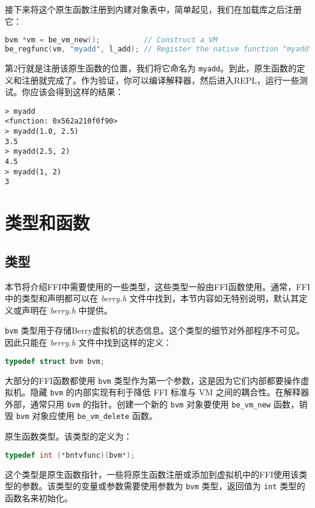 接下来将这个原生函数注册到内建对象表中，简单起见，我们在加载库之后注册它：
\begin{lstlisting}[language=c, style=berry]
bvm *vm = be_vm_new();          // Construct a VM
be_regfunc(vm, "myadd", l_add); // Register the native function "myadd"
\end{lstlisting}
第2行就是注册该原生函数的位置，我们将它命名为 \texttt{myadd}。到此，原生函数的定义和注册就完成了。作为验证，你可以编译解释器，然后进入REPL，运行一些测试。你应该会得到这样的结果：
\begin{lstlisting}[language=berry, numbers=none]
> myadd
<function: 0x562a210f0f90>
> myadd(1.0, 2.5)
3.5
> myadd(2.5, 2)
4.5
> myadd(1, 2)
3
\end{lstlisting}

\section{类型和函数}

\subsection{类型}

本节将介绍FFI中需要使用的一些类型，这些类型一般由FFI函数使用。通常，FFI中的类型和声明都可以在 \textsl{berry.h} 文件中找到，本节内容如无特别说明，默认其定义或声明在 \textsl{berry.h} 中提供。


\texttt{bvm} 类型用于存储Berry虚拟机的状态信息。这个类型的细节对外部程序不可见。因此只能在 \textsl{berry.h} 文件中找到这样的定义：
\begin{lstlisting}[language=c, numbers=none]
typedef struct bvm bvm;
\end{lstlisting}

大部分的FFI函数都使用 \texttt{bvm} 类型作为第一个参数，这是因为它们内部都要操作虚拟机。隐藏 \texttt{bvm} 的内部实现有利于降低 FFI 标准与 VM 之间的耦合性。在解释器外部，通常只用 \texttt{bvm} 的指针。创建一个新的 \texttt{bvm} 对象要使用 \texttt{be\_vm\_new} 函数，销毁 \texttt{bvm} 对象应使用 \texttt{be\_vm\_delete} 函数。


原生函数类型。该类型的定义为：
\begin{lstlisting}[language=c, style=berry, numbers=none]
typedef int (*bntvfunc)(bvm*);
\end{lstlisting}
这个类型是原生函数指针，一些将原生函数注册或添加到虚拟机中的FFI使用该类型的参数。该类型的变量或参数需要使用参数为 \texttt{bvm} 类型，返回值为 \texttt{int} 类型的函数名来初始化。

